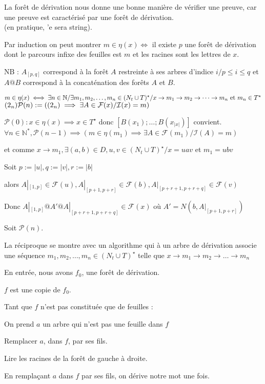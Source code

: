 \documentclass[a4paper,12pt]{article}
\newcommand{\norm}[1]{\lvert #1 \rvert}
\newlength{\mydepth}
\newlength{\myheight}
\newenvironment{answer}
{\par\begin{lrbox}{\mybox}\quad\begin{minipage}{\linewidth}\color{black}\setlength{\parskip}{10pt plus 1pt minus 1pt}\vspace*{-.7\baselineskip}}
{\end{minipage}\end{lrbox}
\settodepth{\mydepth}{\usebox{\mybox}}
\settoheight{\myheight}{\usebox{\mybox}}
\addtolength{\myheight}{\mydepth}
\noindent\makebox[0pt]{
  \color{gray}\hspace{-0pt}\rule[-\mydepth]{1pt}{\myheight}}
  \usebox{\mybox}
  }
\begin{document}
La forêt de dérivation nous donne une bonne manière de vérifier une preuve, car une preuve est caractérisé par une forêt de dérivation.\\

(en pratique, 'e sera string).

Par induction on peut montrer $m \in \eta(x) \iff $ il existe $p$ une forêt de dérivation dont le parcours infixe des feuilles est $m$ et les racines sont les lettres de $x$.

{\color{gray} NB : $A_{[p,q]}$ correspond à la forêt $A$ restreinte à ses arbres d'indice $i / p\leq i \leq q$ et $A@B$ correspond à la concaténation des forêts $A$ et $B$. }\\

\begin{answer} 
$
m \in \eta(x)\\
\iff \exists n \in \mathbb{N} / \exists m_1,m_2,\dots,m_n \in (N_t \cup T)^\star / x \rightarrow m_1 \rightarrow m_2 \rightarrow \dots \rightarrow m_n\text{ et }m_n \in T^\star$    $ (2_n)\\
\mathcal{P}(n) := ((2_n) \implies \exists A \in \mathcal{F}(x) / \mathcal{I}(x) = m)$\\
\begin{answer} 
$\mathcal{P}(0) : x \in \eta(x) \implies x \in T^\star$ donc $[B (x_1);\dots;B (x_{\norm{x}})]$ convient.\\
$\forall n \in \mathbb{N}^*,\mathcal{P}(n-1) \implies (m \in \eta(m_1) \implies \exists A \in \mathcal{F}(m_1)/ \mathcal{I}(A) = m)$

 et comme $x\rightarrow m_1,\exists (a,b) \in D, u,v\in (N_t\cup T)^\star /x = uav$ et $m_1 = ubv$

 Soit $p := \norm{u}, q := \norm{v}, r := \norm{b}$
 
 alors $A|_{[1,p]} \in \mathcal{F}(u), A|_{[p+1,p+r]} \in \mathcal{F}(b), A|_{[p+r+1,p+r+q]} \in \mathcal{F}(v)$

 Donc $A|_{[1,p]}@A'@A|_{[p+r+1,p+r+q]}\in \mathcal{F}(x)$ où $A' = N (b,A|_{[p+1,p+r]})$

 Soit $\mathcal{P}(n)$.
\end{answer}
\end{answer}
La réciproque se montre avec un algorithme qui à un arbre de dérivation associe une séquence $m_1,m_2,\dots,m_n \in (N_t \cup T)^\star$ telle que $x \rightarrow m_1 \rightarrow m_2 \rightarrow \dots \rightarrow m_n$

En entrée, nous avons $f_0$, une forêt de dérivation.
\begin{answer} 
$f$ est une copie de $f_0$. 

Tant que $f$ n'est pas constituée que de feuilles :

\begin{answer} 
    On prend $a$ un arbre qui n'est pas une feuille dans $f$

    Remplacer $a$, dans $f$, par ses fils.

    Lire les racines de la forêt de gauche à droite.
\end{answer}
\end{answer}
En remplaçant $a$ dans $f$ par ses fils, on dérive notre mot une fois.\\\\
\end{document}
